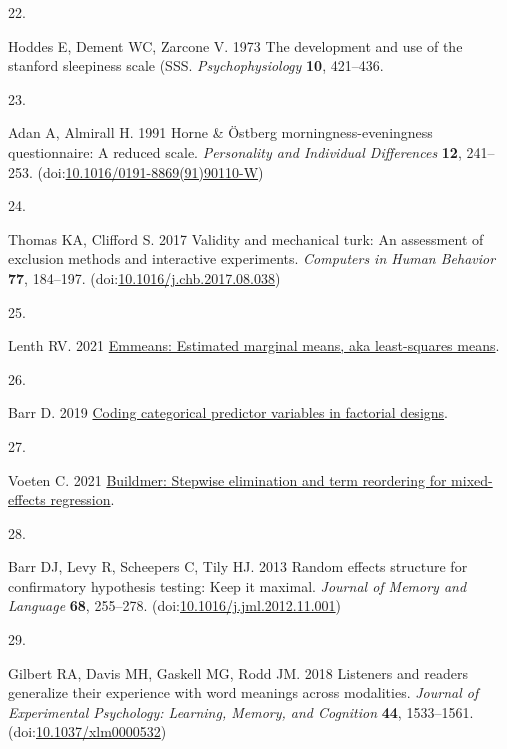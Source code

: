 \documentclass[
]{article}
\newlength{\cslhangindent}
\newlength{\csllabelwidth}
\newlength{\cslentryspacingunit} %
\newenvironment{CSLReferences}[2] %
 {%
  \setlength{\parindent}{0pt}
  \ifodd #1
  \let\oldpar\par
  \def\par{\hangindent=\cslhangindent\oldpar}
  \fi
  \setlength{\parskip}{#2\cslentryspacingunit}
 }%
 {}
\newcommand{\CSLLeftMargin}[1]{\parbox[t]{\csllabelwidth}{#1}}
\newcommand{\CSLRightInline}[1]{\parbox[t]{\linewidth - \csllabelwidth}{#1}\break}
\begin{document}
\begin{CSLReferences}{0}{0}
\leavevmode{}%
\CSLLeftMargin{22. }%
\CSLRightInline{Hoddes E, Dement WC, Zarcone V. 1973 The development and use of the stanford sleepiness scale (SSS. \emph{Psychophysiology} \textbf{10}, 421--436.}

\leavevmode{}%
\CSLLeftMargin{23. }%
\CSLRightInline{Adan A, Almirall H. 1991 Horne \& {Ö}stberg morningness-eveningness questionnaire: A reduced scale. \emph{Personality and Individual Differences} \textbf{12}, 241--253. (doi:\href{https://doi.org/10.1016/0191-8869(91)90110-W}{10.1016/0191-8869(91)90110-W})}

\leavevmode{}%
\CSLLeftMargin{24. }%
\CSLRightInline{Thomas KA, Clifford S. 2017 Validity and mechanical turk: An assessment of exclusion methods and interactive experiments. \emph{Computers in Human Behavior} \textbf{77}, 184--197. (doi:\href{https://doi.org/10.1016/j.chb.2017.08.038}{10.1016/j.chb.2017.08.038})}

\leavevmode{}%
\CSLLeftMargin{25. }%
\CSLRightInline{Lenth RV. 2021 \href{https://CRAN.R-project.org/package=emmeans}{Emmeans: Estimated marginal means, aka least-squares means}. }

\leavevmode{}%
\CSLLeftMargin{26. }%
\CSLRightInline{Barr D. 2019 \href{https://talklab.psy.gla.ac.uk/tvw/catpred/}{Coding categorical predictor variables in factorial designs}. }

\leavevmode{}%
\CSLLeftMargin{27. }%
\CSLRightInline{Voeten C. 2021 \href{https://CRAN.R-project.org/package=buildmer}{Buildmer: Stepwise elimination and term reordering for mixed-effects regression}. }

\leavevmode{}%
\CSLLeftMargin{28. }%
\CSLRightInline{Barr DJ, Levy R, Scheepers C, Tily HJ. 2013 Random effects structure for confirmatory hypothesis testing: Keep it maximal. \emph{Journal of Memory and Language} \textbf{68}, 255--278. (doi:\href{https://doi.org/10.1016/j.jml.2012.11.001}{10.1016/j.jml.2012.11.001})}

\leavevmode{}%
\CSLLeftMargin{29. }%
\CSLRightInline{Gilbert RA, Davis MH, Gaskell MG, Rodd JM. 2018 Listeners and readers generalize their experience with word meanings across modalities. \emph{Journal of Experimental Psychology: Learning, Memory, and Cognition} \textbf{44}, 1533--1561. (doi:\href{https://doi.org/10.1037/xlm0000532}{10.1037/xlm0000532})}


\end{CSLReferences}
\end{document}
